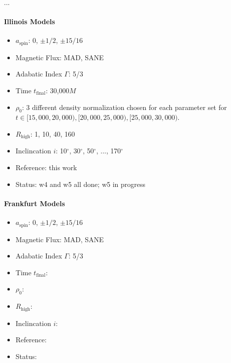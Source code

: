 \documentclass[twocolumn,twocolappendix,tighten,dvipsnames,linenumbers]{aastex63}
\begin{document}
...

\paragraph{Illinois Models}

\begin{itemize}
\item $a_\mathrm{spin}$: 0, $\pm1/2$, $\pm15/16$
\item Magnetic Flux: MAD, SANE
\item Adabatic Index $\Gamma$: 5/3
\item Time $t_\mathrm{final}$: 30,000$M$
\item $\rho_0$: 3 different density normalization chosen for each parameter set for $t \in [15,000, 20,000), [20,000, 25,000), [25,000, 30,000)$.
\item $R_\mathrm{high}$: 1, 10, 40, 160
\item Inclincation $i$: 10$^\circ$, 30$^\circ$, 50$^\circ$, ..., 170$^\circ$
\item Reference: this work
\item Status: w4 and w5 all done; w5 in progress
\end{itemize}

\paragraph{Frankfurt Models}

\begin{itemize}
\item $a_\mathrm{spin}$: 0, $\pm1/2$, $\pm15/16$
\item Magnetic Flux: MAD, SANE
\item Adabatic Index $\Gamma$: 5/3
\item Time $t_\mathrm{final}$:
\item $\rho_0$:
\item $R_\mathrm{high}$:
\item Inclincation $i$:
\item Reference:
\item Status:
\end{itemize}
\end{document}
